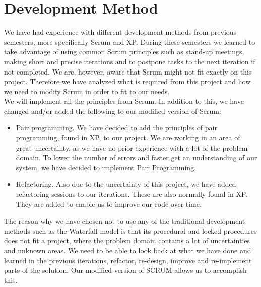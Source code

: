 \section{Development Method}
We have had experience with different development methods from previous semesters, more specifically Scrum and XP.
During these semesters we learned to take advantage of using common Scrum principles such as stand-up meetings, making short and precise iterations and to postpone tasks to the next iteration if not completed.
We are, however, aware that Scrum might not fit exactly on this project.
Therefore we have analyzed what is required from this project and how we need to modify Scrum in order to fit to our needs. \\

We will implement all the principles from Scrum. In addition to this, we have changed and/or added the following to our modified version of Scrum:
\begin{itemize}
    \item Pair programming. We have decided to add the principles of pair programming, found in XP, to our project. We are working in an area of great uncertainty, as we have no prior experience with a lot of the problem domain. To lower the number of errors and faster get an understanding of our system, we have decided to implement Pair Programming.
    \item Refactoring. Also due to the uncertainty of this project, we have added refactoring sessions to our iterations. These are also normally found in XP. They are added to enable us to improve our code over time.
\end{itemize}

The reason why we have chosen not to use any of the traditional development methods such as the Waterfall model is that its procedural and locked procedures does not fit a project, where the problem domain contains a lot of uncertainties and unknown areas. We need to be able to look back at what we have done and learned in the previous iterations, refactor, re-design, improve and re-implement parts of the solution. Our modified version of SCRUM allows us to accomplish this.
